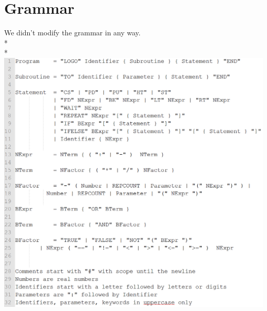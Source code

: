 \newpage
\section{Grammar}
\label{sec:grammar}
We didn't modify the grammar in any way.\\*\\*
\includegraphics[scale=1.0]{bilder/grammar.png}



